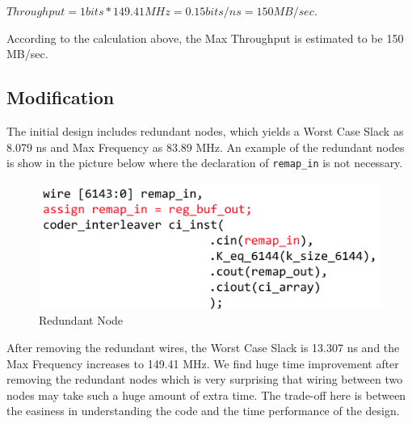 \documentclass[letterpaper, 12pt]{article} %
\begin{document}
    $Throughput = 1 bits * 149.41 MHz = 0.15 bits/ns = 150 MB/sec$.

\noindent According to the calculation above, the Max Throughput is estimated to be 150 MB/sec. 


\subsection{Modification}
The initial design includes redundant nodes, which yields a Worst Case Slack as 8.079 ns and Max Frequency as 83.89 MHz. An example of the redundant nodes is show in the picture below where the declaration of \texttt{remap\_in} is not necessary.
\begin{figure}[h!]
\centering
\includegraphics[scale=0.4]{node.png}
\caption{Redundant Node}
\label{fig1}
\end{figure}

\noindent After removing the redundant wires, the Worst Case Slack is 13.307 ns and the Max Frequency increases to 149.41 MHz. We find huge time improvement after removing the redundant nodes which is very surprising that wiring between two nodes may take such a huge amount of extra time. The trade-off here is between the easiness in understanding the code and the time performance of the design.
\end{document}
